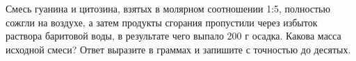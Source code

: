 
Смесь гуанина и цитозина, взятых в молярном соотношении 1:5, полностью сожгли на воздухе, а затем продукты сгорания пропустили через избыток раствора баритовой воды, 
в результате чего выпало 200 г осадка. Какова масса исходной смеси? Ответ выразите в граммах и запишите с 
точностью до десятых.

